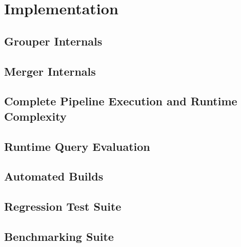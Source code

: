 \chapter{Implementation}\label{ch:implementation}

\section{Grouper Internals}\label{sec:grouper-internals}
\section{Merger Internals}\label{sec:merger-internals}
\section{Complete Pipeline Execution and Runtime Complexity}\label{sec:robust-pipeline}
\section{Runtime Query Evaluation}\label{sec:runtime-query}
\section{Automated Builds}\label{sec:cmake}
\section{Regression Test Suite}\label{sec:cmake}
\section{Benchmarking Suite}\label{sec:cmake}
